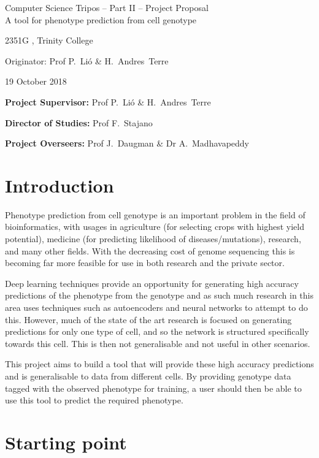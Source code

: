 \documentclass[12pt,a4paper,twoside,openany]{article}
\begin{document}
\begin{center}
\Large
Computer Science Tripos -- Part II -- Project Proposal\\[4mm]
\LARGE
A tool for phenotype prediction from cell genotype

\large
2351G , Trinity College

Originator: Prof P.~Li\'o \& H.~Andres~Terre

19 October 2018
\end{center}

\vspace{5mm}

\textbf{Project Supervisor:} Prof P.~Li\'o \& H.~Andres~Terre

\textbf{Director of Studies:} Prof F.~Stajano

\textbf{Project Overseers:} Prof J.~Daugman  \& Dr A.~Madhavapeddy


\section*{Introduction}

Phenotype prediction from cell genotype is an important problem in the field of bioinformatics, with usages in agriculture (for selecting crops with highest yield potential), medicine (for predicting likelihood of diseases/mutations), research, and many other fields. With the decreasing cost of genome sequencing this is becoming far more feasible for use in both research and the private sector.

Deep learning techniques provide an opportunity for generating high accuracy predictions of the phenotype from the genotype and as such much research in this area uses techniques such as autoencoders and neural networks to attempt to do this. However, much of the state of the art research is focused on generating predictions for only one type of cell, and so the network is structured specifically towards this cell. This is then not generalisable and not useful in other scenarios.

This project aims to build a tool that will provide these high accuracy predictions and is generalisable to data from different cells. By providing genotype data tagged with the observed phenotype for training, a user should then be able to use this tool to predict the required phenotype.

\section*{Starting point}
\end{document}
